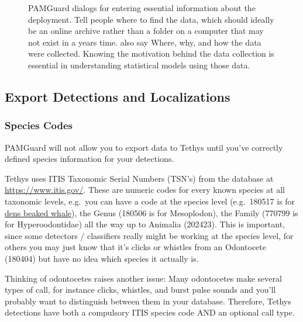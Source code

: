\documentclass[
]{article}
\begin{document}
\begin{figure}
\begin{minipage}{0.50\linewidth}
{}


\end{minipage}%

\caption{\label{fig-cal}PAMGuard dialogs for entering essential
information about the deployment. Tell people where to find the data,
which should ideally be an online archive rather than a folder on a
computer that may not exist in a years time. also say Where, why, and
how the data were collected. Knowing the motivation behind the data
collection is essential in understanding statistical models using those
data.}

\end{figure}%

\subsection{Export Detections and
Localizations}\label{export-detections-and-localizations}

\subsubsection{Species Codes}\label{species-codes}

PAMGuard will not allow you to export data to Tethys until you've
correctly defined species information for your detections.

Tethys uses ITIS Taxonomic Serial Numbers (TSN's) from the database at
\url{https://www.itis.gov/}. These are numeric codes for every known
species at all taxonomic levels, e.g.~you can have a code at the species
level (e.g.~180517 is for
\href{https://www.itis.gov/servlet/SingleRpt/SingleRpt?search_topic=TSN&search_value=180517\#null}{dens
beaked whale}), the Genus (180506 is for Mesoplodon), the Family (770799
is for Hyperoodontidae) all the way up to Animalia (202423). This is
important, since some detectors / classifiers really might be working at
the species level, for others you may just know that it's clicks or
whistles from an Odontocete (180404) but have no idea which species it
actually is.

Thinking of odontocetes raises another issue: Many odontocetes make
several types of call, for instance clicks, whistles, and burst pulse
sounds and you'll probably want to distinguish between them in your
database. Therefore, Tethys detections have both a compulsory ITIS
species code AND an optional call type.
\end{document}
